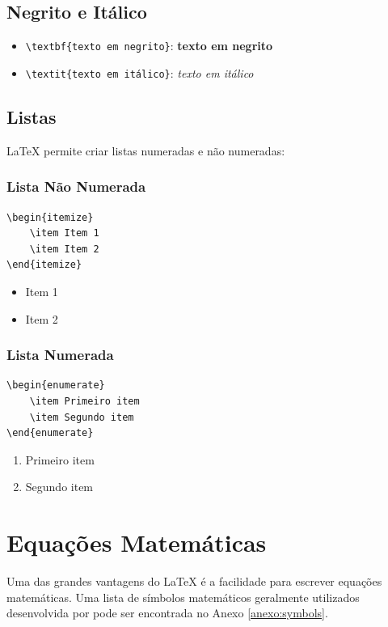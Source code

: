 \begin{apendicesenv}
\subsection*{Negrito e Itálico}
\begin{itemize}
    \item \texttt{\textbackslash textbf\{texto em negrito\}}: \textbf{texto em negrito}
    \item \texttt{\textbackslash textit\{texto em itálico\}}: \textit{texto em itálico}
\end{itemize}

\subsection*{Listas}
\LaTeX{} permite criar listas numeradas e não numeradas:

\subsubsection*{Lista Não Numerada}
\begin{verbatim}
\begin{itemize}
    \item Item 1
    \item Item 2
\end{itemize}
\end{verbatim}

\begin{itemize}
    \item Item 1
    \item Item 2
\end{itemize}

\subsubsection*{Lista Numerada}
\begin{verbatim}
\begin{enumerate}
    \item Primeiro item
    \item Segundo item
\end{enumerate}
\end{verbatim}

\begin{enumerate}
    \item Primeiro item
    \item Segundo item
\end{enumerate}

\section*{Equações Matemáticas}
Uma das grandes vantagens do \LaTeX{} é a facilidade para escrever equações matemáticas. Uma lista de símbolos matemáticos geralmente utilizados desenvolvida por  pode ser encontrada no Anexo \ref{anexo:symbols}.


\end{apendicesenv}
